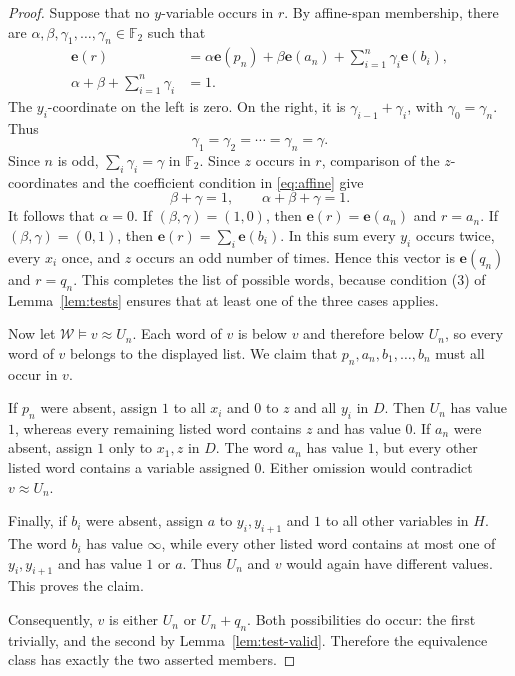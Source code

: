 \documentclass[11pt,reqno]{amsart}
\numberwithin{equation}{section}
\theoremstyle{definition}
\theoremstyle{remark}
\newcommand{\W}{\mathcal W}
\newcommand{\F}{\mathbb F_2}
\newcommand{\eqid}{\approx}
\newcommand{\ivec}[1]{\mathbf e(#1)}
\begin{document}
\begin{proof}
Suppose that no $y$-variable occurs in $r$. By affine-span
membership, there are $\alpha,\beta,\gamma_1,\ldots,\gamma_n\in\F$
such that
\begin{equation}\label{eq:affine}
\begin{aligned}
\ivec{r}
 &=\alpha\ivec{p_n}+\beta\ivec{a_n}
       +\sum_{i=1}^{n}\gamma_i\ivec{b_i},\\
\alpha+\beta+\sum_{i=1}^{n}\gamma_i&=1.
\end{aligned}
\end{equation}
The $y_i$-coordinate on the left is zero. On the right, it is
$\gamma_{i-1}+\gamma_i$, with $\gamma_0=\gamma_n$.
Thus
\[
\gamma_1=\gamma_2=\cdots=\gamma_n=\gamma.
\]
Since $n$ is odd, $\sum_i\gamma_i=\gamma$ in $\F$.
Since $z$ occurs in $r$, comparison of the $z$-coordinates
and the coefficient condition in \eqref{eq:affine} give
\[
\beta+\gamma=1,\qquad \alpha+\beta+\gamma=1.
\]
It follows that $\alpha=0$. If $(\beta,\gamma)=(1,0)$,
then $\ivec{r}=\ivec{a_n}$ and $r=a_n$.
If $(\beta,\gamma)=(0,1)$, then
$\ivec{r}=\sum_i\ivec{b_i}$.
In this sum every $y_i$ occurs twice, every $x_i$ once, and
$z$ occurs an odd number of times. Hence this vector is
$\ivec{q_n}$ and $r=q_n$. This completes the list of possible
words, because condition (3) of Lemma~\ref{lem:tests} ensures
that at least one of the three cases applies.

Now let $\W\models v\eqid U_n$. Each word of $v$ is below
$v$ and therefore below $U_n$, so every word of $v$ belongs
to the displayed list. We claim that $p_n,a_n,b_1,\ldots,b_n$
must all occur in $v$.

If $p_n$ were absent, assign $1$ to all $x_i$ and $0$ to
$z$ and all $y_i$ in $D$. Then $U_n$ has value $1$,
whereas every remaining listed word contains $z$ and has value
$0$. If $a_n$ were absent, assign $1$ only to $x_1,z$ in
$D$. The word $a_n$ has value $1$, but every other listed
word contains a variable assigned $0$. Either omission would
contradict $v\eqid U_n$.

Finally, if $b_i$ were absent, assign $a$ to
$y_i,y_{i+1}$ and $1$ to all other variables in $H$.
The word $b_i$ has value $\infty$, while every other listed
word contains at most one of $y_i,y_{i+1}$ and has value
$1$ or $a$. Thus $U_n$ and $v$ would again have different
values. This proves the claim.

Consequently, $v$ is either $U_n$ or $U_n+q_n$.
Both possibilities do occur: the first trivially, and the
second by Lemma~\ref{lem:test-valid}. Therefore the equivalence class has
exactly the two asserted members.
\end{proof}
\end{document}
